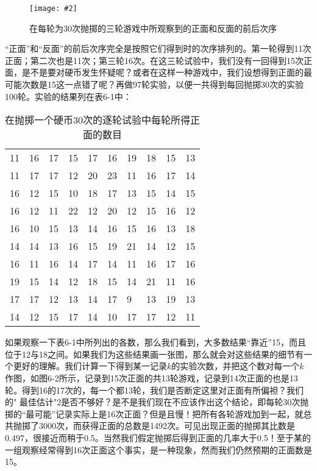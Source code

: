 \documentclass[12pt,oneside]{book}
\newenvironment{fig}[2][1]
{\begin{figure}[H]
\centering
\texttt{[image: \#2]}}
{\end{figure}}
\begin{document}
\begin{fig}{三十次抛掷正面和反面的前后次序}
\caption{\footnotesize 在每轮为30次抛掷的三轮游戏中所观察到的正面和反面的前后次序}
\label{fig:三十次抛掷正面和反面的前后次序}
\end{fig}
“正面”和“反面”的前后次序完全是按照它们得到时的次序排列的。第一轮得到11次正面；第二次也是11次；第三轮16次。在这三轮试验中，我们没有一回得到15次正面，是不是要对硬币发生怀疑呢？或者在这样一种游戏中，我们设想得到正面的最可能次数是15这一点错了呢？再做97轮实验，以便一共得到每回抛掷30次的实验100轮。实验的结果列在表6-1中：
\begin{table}[H]
\caption{\footnotesize 在抛掷一个硬币30次的逐轮试验中每轮所得正面的数目}
\centering
\medskip 
\begin{tabular}{p{20pt} p{20pt} p{20pt} p{20pt} p{20pt} p{20pt} p{20pt} p{20pt} p{20pt} p{20pt}}
\toprule
11 & 16 & 17 & 15 & 17 & 16 & 19 & 18 & 15 & 13     \\
11 & 17 & 17 & 12 & 20 & 23 & 11 & 16 & 17 & 14       \\
16 & 12 & 15 & 10 & 18 & 17 & 13 & 15 & 14 & 15     \\
16 & 12 & 11 & 22 & 12 & 20 & 12 & 15 & 16 & 12       \\
16 & 10 & 15 & 13 & 14 & 16 & 15 & 16 & 13 & 18       \\
14 & 14 & 13 & 16 & 15 & 19 & 21 & 14 & 12 & 15      \\
16 & 11 & 16 & 14 & 17 & 14 & 11 & 16 & 17 & 16      \\
19 & 15 & 14 & 12 & 18 & 15 & 14 & 21 & 11 & 16      \\
17 & 17 & 12 & 13 & 14 & 17 & 9  & 13 & 19 & 13    \\
14 & 12 & 15 & 17 & 14 & 10 & 17 & 17 & 12 & 11      \\    
\bottomrule        
\end{tabular}
\end{table}

如果观察一下表6-1中所列出的各数，那么我们看到，大多数结果“靠近”15，而且位于12与18之间。如果我们为这些结果画一张图，那么就会对这些结果的细节有一个更好的理解。我们计算一下得到某一记录$k$的实验次数，并把这个数对每一个$k$作图，如图6-2所示，记录到15次正面的共13轮游戏，记录到14次正面的也是13轮。得到16的17次的，每一个都13轮，我们是否断定这里对正面有所偏袒？我们的" 最佳估计"2是否不够好？是不是我们现在不应该作出这个结论，即每轮30次抛掷的“最可能”记录实际上是16次正面？但是且慢！把所有各轮游戏加到一起，就总共抛掷了3000次，而获得正面的总数是1492次。可见出现正面的抛掷其比数是0.497，很接近而稍于0.5。当然我们假定抛掷后得到正面的几率大于0.5！至于某的一组观察经常得到16次正面这个事实，是一种现象，然而我们仍然预期的正面数是15。
\end{document}
